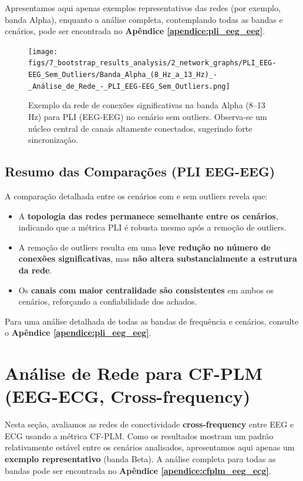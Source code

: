 Apresentamos aqui apenas exemplos representativos das redes (por exemplo, banda Alpha), enquanto a análise completa, contemplando todas as bandas e cenários, pode ser encontrada no \textbf{Apêndice \ref{apendice:pli_eeg_eeg}}.

\begin{figure}[htb]
  \centering
  \texttt{[image: figs/7\_bootstrap\_results\_analysis/2\_network\_graphs/PLI\_EEG-EEG\_Sem\_Outliers/Banda\_Alpha\_(8\_Hz\_a\_13\_Hz)\_-\_Análise\_de\_Rede\_-\_PLI\_EEG-EEG\_Sem\_Outliers.png]}
  \caption{Exemplo da rede de conexões significativas na banda Alpha (8--13\,Hz) para PLI (EEG-EEG) no cenário sem outliers. Observa-se um núcleo central de canais altamente conectados, sugerindo forte sincronização.}
  \label{fig:exemplo_rede_pli_alpha_sem}
\end{figure}

\subsection{Resumo das Comparações (PLI EEG-EEG)}

A comparação detalhada entre os cenários com e sem outliers revela que:

\begin{itemize}
    \item A \textbf{topologia das redes permanece semelhante entre os cenários}, indicando que a métrica PLI é robusta mesmo após a remoção de outliers.
    \item A remoção de outliers resulta em uma \textbf{leve redução no número de conexões significativas}, mas \textbf{não altera substancialmente a estrutura da rede}.
    \item Os \textbf{canais com maior centralidade são consistentes} em ambos os cenários, reforçando a confiabilidade dos achados.
\end{itemize}

Para uma análise detalhada de todas as bandas de frequência e cenários, consulte o \textbf{Apêndice \ref{apendice:pli_eeg_eeg}}.

\section{Análise de Rede para CF-PLM (EEG-ECG, Cross-frequency)}
\label{sec:rede_cfplm_eeg_ecg}

Nesta seção, avaliamos as redes de conectividade \textbf{cross-frequency} entre EEG e ECG usando a métrica CF-PLM. Como os resultados mostram um padrão relativamente estável entre os cenários analisados, apresentamos aqui apenas um \textbf{exemplo representativo} (banda Beta). A análise completa para todas as bandas pode ser encontrada no \textbf{Apêndice \ref{apendice:cfplm_eeg_ecg}}.

